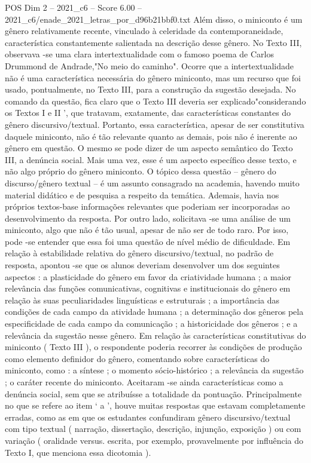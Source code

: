 \begin{textsample}{POS Dim 2 – 2021\_c6 – Score 6.00 – 2021\_c6/enade\_2021\_letras\_por\_d96b21bbf0.txt}
Além disso, o miniconto é um gênero relativamente recente, vinculado à celeridade da contemporaneidade, característica constantemente salientada na descrição desse gênero.
No Texto III, observava -se uma clara intertextualidade com o famoso poema de Carlos Drummond de Andrade,"No meio do caminho".
Ocorre que a intertextualidade não é uma característica necessária do gênero miniconto, mas um recurso que foi usado, pontualmente, no Texto III, para a construção da sugestão desejada.
No comando da questão, fica claro que o Texto III deveria ser explicado"considerando os Textos I e II ', que tratavam, exatamente, das características constantes do gênero discursivo/textual.
Portanto, essa característica, apesar de ser constitutiva daquele miniconto, não é tão relevante quanto as demais, pois não é inerente ao gênero em questão.
O mesmo se pode dizer de um aspecto semântico do Texto III, a denúncia social.
Mais uma vez, esse é um aspecto específico desse texto, e não algo próprio do gênero miniconto.
O tópico dessa questão – gênero do discurso/gênero textual – é um assunto consagrado na academia, havendo muito material didático e de pesquisa a respeito da temática.
Ademais, havia nos próprios textos-base informações relevantes que poderiam ser incorporadas ao desenvolvimento da resposta.
Por outro lado, solicitava -se uma análise de um miniconto, algo que não é tão usual, apesar de não ser de todo raro.
Por isso, pode -se entender que essa foi uma questão de nível médio de dificuldade.
Em relação à estabilidade relativa do gênero discursivo/textual, no padrão de resposta, apontou -se que os alunos deveriam desenvolver um dos seguintes aspectos : a plasticidade do gênero em favor da criatividade humana ; a maior relevância das funções comunicativas, cognitivas e institucionais do gênero em relação às suas peculiaridades linguísticas e estruturais ; a importância das condições de cada campo da atividade humana ; a determinação dos gêneros pela especificidade de cada campo da comunicação ; a historicidade dos gêneros ; e a relevância da sugestão nesse gênero.
Em relação às características constitutivas do miniconto ( Texto III ), o respondente poderia recorrer às condições de produção como elemento definidor do gênero, comentando sobre características do miniconto, como : a síntese ; o momento sócio-histórico ; a relevância da sugestão ; o caráter recente do miniconto.
Aceitaram -se ainda características como a denúncia social, sem que se atribuísse a totalidade da pontuação.
Principalmente no que se refere ao item ‘ a ’, houve muitas respostas que estavam completamente erradas, como as em que os estudantes confundiram gênero discursivo/textual com tipo textual ( narração, dissertação, descrição, injunção, exposição ) ou com variação ( oralidade versus. escrita, por exemplo, provavelmente por influência do Texto I, que menciona essa dicotomia ).

\end{textsample}
